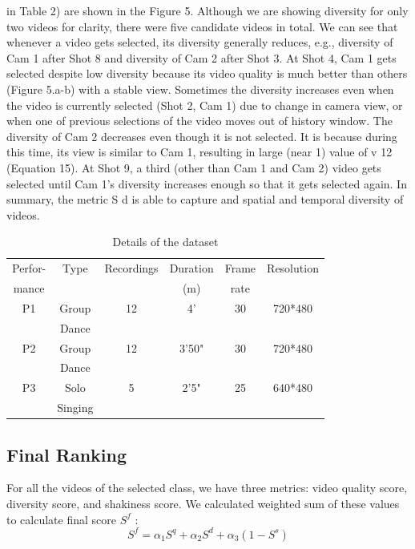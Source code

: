 \documentclass{clsfile}
\begin{document}
in Table 2) are shown in the Figure 5. Although we are showing
diversity for only two videos for clarity, there were five candidate
videos in total. We can see that whenever a video gets selected,
its diversity generally reduces, e.g., diversity of Cam 1 after Shot 8
and diversity of Cam 2 after Shot 3. At Shot 4, Cam 1 gets selected
despite low diversity because its video quality is much better than
others (Figure 5.a-b) with a stable view. Sometimes the diversity
increases even when the video is currently selected (Shot 2, Cam 1)
due to change in camera view, or when one of previous selections
of the video moves out of history window. The diversity of Cam 2
decreases even though it is not selected. It is because during this
time, its view is similar to Cam 1, resulting in large (near 1) value
of v 12 (Equation 15). At Shot 9, a third (other than Cam 1 and Cam
2) video gets selected until Cam 1’s diversity increases enough so
that it gets selected again. In summary, the metric S d is able to
capture and spatial and temporal diversity of videos.
\begin{table}
\centering
\caption{ Details of the dataset}
\begin{tabular}{c|c|c|c|c|c} \hline
Perfor-&Type&Recordings&Duration&Frame&Resolution\\
mance& & &(m)&rate& \\ \hline
P1 & Group&12& 4' &30&720*480\\
&Dance& & & & \\ \hline
P2 & Group&12& 3'50" &30&720*480\\
& Dance& & & &\\  \hline
P3 & Solo&5& 2'5" &25&640*480\\
& Singing& & & &\\
\hline\end{tabular}
\end{table}
\subsection{Final Ranking}
For all the videos of the selected class, we have three metrics:
video quality score, diversity score, and shakiness score. We calculated weighted sum of these values to calculate final score $S^f$ :
\begin{equation}
    S^f = {\alpha}_1S^q + {\alpha}_2S^d + {\alpha}_3(1-S^s)
\end{equation}
\end{document}

